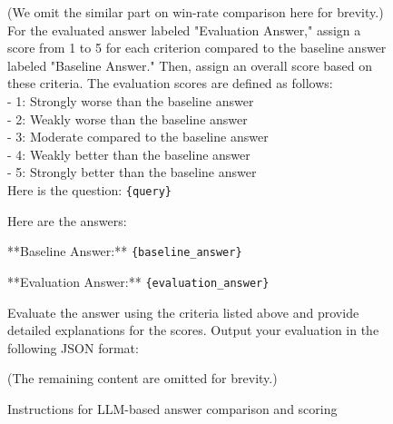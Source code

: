 \begin{figure*}[t]
\begin{tcolorbox}[title=\texttt{Instructions for Win-Rate \& Quantitative Comparison}]
(We omit the similar part on win-rate comparison here for brevity.)\\

For the evaluated answer labeled "Evaluation Answer," assign a score from 1 to 5 for each criterion compared to the baseline answer labeled "Baseline Answer." Then, assign an overall score based on these criteria.
The evaluation scores are defined as follows:\\
- 1: Strongly worse than the baseline answer\\
- 2: Weakly worse than the baseline answer\\
- 3: Moderate compared to the baseline answer\\
- 4: Weakly better than the baseline answer\\
- 5: Strongly better than the baseline answer\\


Here is the question:
\texttt{\{query\}}

Here are the answers:

**Baseline Answer:**
\texttt{\{baseline\_answer\}}

**Evaluation Answer:**
\texttt{\{evaluation\_answer\}\\}


Evaluate the answer using the criteria listed above and provide detailed explanations for the scores.
Output your evaluation in the following JSON format:

(The remaining content are omitted for brevity.)

\end{tcolorbox}
\caption{Instructions for LLM-based answer comparison and scoring}
\label{fig:prompt}
\end{figure*}